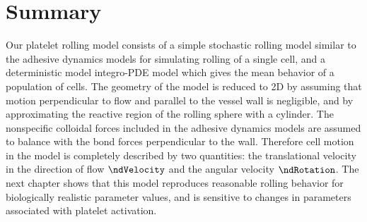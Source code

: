 \section{Summary}
\label{sec:summary-model}

Our platelet rolling model consists of a simple stochastic rolling
model similar to the adhesive dynamics models for simulating rolling
of a single cell, and a deterministic model integro-PDE model which
gives the mean behavior of a population of cells. The geometry of the
model is reduced to 2D by assuming that motion perpendicular to flow
and parallel to the vessel wall is negligible, and by approximating
the reactive region of the rolling sphere with a cylinder. The
nonspecific colloidal forces included in the adhesive dynamics models
\cite{Hammer2014} are assumed to balance with the bond forces
perpendicular to the wall. Therefore cell motion in the model is
completely described by two quantities: the translational velocity in
the direction of flow $\ndVelocity$ and the angular velocity
$\ndRotation$. The next chapter shows that this model reproduces
reasonable rolling behavior for biologically realistic parameter
values, and is sensitive to changes in parameters associated with
platelet activation. 


